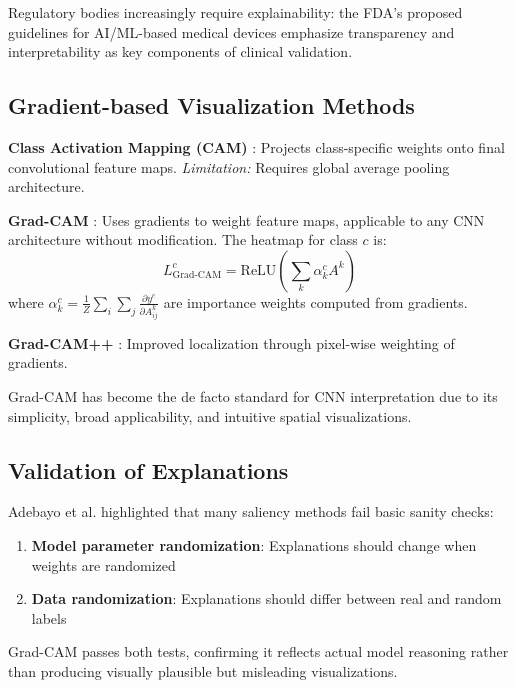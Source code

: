 Regulatory bodies increasingly require explainability: the FDA's proposed guidelines for AI/ML-based medical devices emphasize transparency and interpretability as key components of clinical validation.

\subsection{Gradient-based Visualization Methods}

\textbf{Class Activation Mapping (CAM)} \cite{zhou2016learning}: Projects class-specific weights onto final convolutional feature maps. \textit{Limitation:} Requires global average pooling architecture.

\textbf{Grad-CAM} \cite{selvaraju2017grad}: Uses gradients to weight feature maps, applicable to any CNN architecture without modification. The heatmap for class $c$ is:
\begin{equation}
L^c_{\text{Grad-CAM}} = \text{ReLU}\left(\sum_k \alpha_k^c A^k\right)
\end{equation}
where $\alpha_k^c = \frac{1}{Z}\sum_i\sum_j \frac{\partial y^c}{\partial A^k_{ij}}$ are importance weights computed from gradients.

\textbf{Grad-CAM++} \cite{chattopadhay2018grad}: Improved localization through pixel-wise weighting of gradients.

Grad-CAM has become the de facto standard for CNN interpretation due to its simplicity, broad applicability, and intuitive spatial visualizations.

\subsection{Validation of Explanations}

Adebayo et al. \cite{adebayo2018sanity} highlighted that many saliency methods fail basic sanity checks:

\begin{enumerate}
    \item \textbf{Model parameter randomization}: Explanations should change when weights are randomized
    \item \textbf{Data randomization}: Explanations should differ between real and random labels
\end{enumerate}

Grad-CAM passes both tests, confirming it reflects actual model reasoning rather than producing visually plausible but misleading visualizations.

